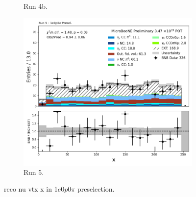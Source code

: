 \begin{figure}[H]
\begin{subfigure}[t]{0.32\linewidth}
        \caption{Run 4b.}
    \end{subfigure}%
    \hspace{0.2cm}%
    \begin{subfigure}[t]{0.32\linewidth}
        \includegraphics[width=\linewidth]{technote/Appendix_Preselection/Figures/1e0p0pi/Run5/reco_nu_vtx_x_Run5_1e0p0pi_Presel.png}
        \caption{Run 5.}
    \end{subfigure}
    \caption{reco nu vtx x in 1$e$0$p$0$\pi$ preselection.}
\end{figure}


